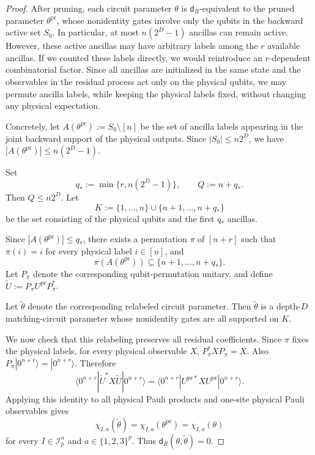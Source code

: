 \documentclass[10pt,a4paper]{amsart}
\newcommand{\mcI}{\mathcal{I}}
\begin{document}
\begin{proof}
After pruning, each circuit parameter \(\theta\) is \(\mathsf d_R\)-equivalent
to the pruned parameter \(\theta^{\mathrm{pr}}\), whose nonidentity gates
involve only the qubits in the backward active set \(S_0\). In particular, at
most \(n(2^D-1)\) ancillas can remain active. However, these active ancillas
may have arbitrary labels among the \(r\) available ancillas. If we counted
these labels directly, we would reintroduce an \(r\)-dependent combinatorial
factor. Since all ancillas are initialized in the same state and the observables
in the residual process act only on the physical qubits, we may permute ancilla
labels, while keeping the physical labels fixed, without changing any physical
expectation.

Concretely, let $A(\theta^{\mathrm{pr}}):=S_0\setminus[n]$ be the set of ancilla labels appearing in the joint backward support of the
physical outputs. Since \(|S_0|\le n2^D\), we have $|A(\theta^{\mathrm{pr}})|\le n(2^D-1)$.

Set
\[
    q_*:=\min\{r,n(2^D-1)\},
    \qquad
    Q:=n+q_*.
\]
Then \(Q\le n2^D\). Let
\[
    K:=\{1,\dots,n\}\cup\{n+1,\dots,n+q_*\}
\]
be the set consisting of the physical qubits and the first \(q_*\) ancillas.

Since \(|A(\theta^{\mathrm{pr}})|\le q_*\), there exists a permutation \(\pi\)
of \([n+r]\) such that \(\pi(i)=i\) for every physical label \(i\in[n]\), and
\[
    \pi(A(\theta^{\mathrm{pr}}))\subseteq\{n+1,\dots,n+q_*\}.
\]
Let \(P_\pi\) denote the corresponding qubit-permutation unitary, and define $\widetilde U:=P_\pi U^{\mathrm{pr}}P_\pi^*$.

Let \(\widetilde\theta\) denote the corresponding relabeled circuit parameter.
Then \(\widetilde\theta\) is a depth-\(D\) matching-circuit parameter whose
nonidentity gates are all supported on \(K\).

We now check that this relabeling preserves all residual coefficients. Since
\(\pi\) fixes the physical labels, for every physical observable \(X\), $P_\pi^*XP_\pi=X$. Also \(P_\pi|0^{n+r}\rangle=|0^{n+r}\rangle\). Therefore
\[
\langle0^{n+r}|\widetilde U^*X\widetilde U|0^{n+r}\rangle
=
\langle0^{n+r}|
U^{\mathrm{pr}*}XU^{\mathrm{pr}}
|0^{n+r}\rangle.
\]
Applying this identity to all physical Pauli products and one-site physical
Pauli observables gives
\[
    \chi_{I,a}(\widetilde\theta)
    =
    \chi_{I,a}(\theta^{\mathrm{pr}})
    =
    \chi_{I,a}(\theta)
\]
for every \(I\in\mcI_p^n\) and \(a\in\{1,2,3\}^p\). Thus $\mathsf d_R(\theta,\widetilde\theta)=0$.



\end{proof}
\end{document}

